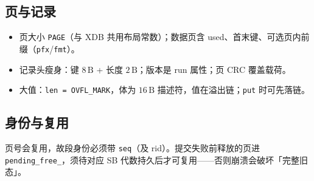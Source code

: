 \subsection{页与记录}
\begin{itemize}[leftmargin=1.6em]
  \item 页大小 \texttt{PAGE}（与 XDB 共用布局常数）；数据页含 used、首末键、可选页内前缀（\texttt{pfx}/\texttt{fmt}）。
  \item 记录头瘦身：键 $8\,\mathrm{B}$ + 长度 $2\,\mathrm{B}$；版本是 run 属性；页 CRC 覆盖载荷。
  \item 大值：\texttt{len = OVFL\_MARK}，体为 $16\,\mathrm{B}$ 描述符，值在溢出链；\texttt{put} 时可先落链。
\end{itemize}

\subsection{身份与复用}
页号会复用，故段身份必须带 \texttt{seq}（及 rid）。提交失败前释放的页进 \texttt{pending\_free\_}，须待对应 SB 代数持久后才可复用——否则崩溃会破坏「完整旧态」。
